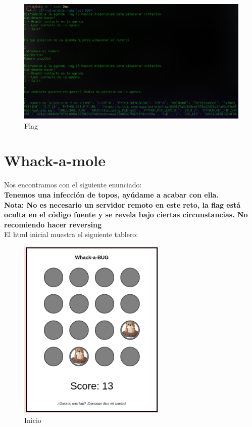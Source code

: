 \documentclass[12pt, a4paper,twoside,titlepage]{article}
\begin{document}
\begin{figure}[H]
    \centering
    \includegraphics[width=1\linewidth]{Figuras/Agenda2/agenda2.png}
    \caption{Flag}
    \label{fig:my_label}
\end{figure}

\newpage
\section{Whack-a-mole}

Nos encontramos con el siguiente enunciado:\\

\textbf{Tenemos una infección de topos, ayúdame a acabar con ella.
\\
Nota: No es necesario un servidor remoto en este reto, la flag está oculta en el código fuente y se revela bajo ciertas circunstancias. No recomiendo hacer reversing}
\\

El html inicial muestra el siguiente tablero:
\begin{figure}[H]
    \centering
    \includegraphics[width=70mm]{Figuras/WhackAMole/Inicio.png}
    \caption{Inicio}
    \label{fig:my_label}
\end{figure}
\end{document}
